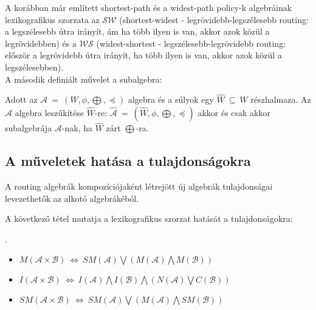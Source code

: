   A korábban már említett shortest-path és a widest-path policy-k algebráinak lexikografikus szorzata az $\mathcal{SW}$ (shortest-widest - legrövidebb-legszélesebb routing: a legszélesebb útra irányít, ám ha több ilyen is van, akkor azok közül a legrövidebben) és a $\mathcal{WS}$ (widest-shortest - legszélesebb-legrövidebb routing: először a legrövidebb útra irányít, ha több ilyen is van, akkor azok közül a legszélesebben).\\

  A második definiált művelet a subalgebra:
  \begin{definition} 
    Adott az $\mathcal{A}~=~(W,\phi,\bigoplus,\preceq)$ algebra és a súlyok egy $\hat{W}~\subseteq~W$ részhalmaza. Az $\mathcal{A}$ algebra leszűkítése $\hat{W}$-re: $\hat{\mathcal{A}}~=~(\hat{W},\phi,\bigoplus,\preceq)$ akkor és csak akkor subalgebrája $\mathcal{A}$-nak, ha $\hat{W}$ zárt $\bigoplus$-ra.
  \end{definition}

    \subsection{A műveletek hatása a tulajdonságokra}\label{sect:section_algebramuveletek_tulajdonsagok}

    A routing algebrák kompozíciójaként létrejött új algebrák tulajdonságai levezethetők az alkotó algebrákéból.

    A következő tétel mutatja a lexikografikus szorzat hatását a tulajdonságokra:
    \begin{theorem}\label{eq:lexi}
      .
      \begin{itemize}
      \item $M(\mathcal{A} \times \mathcal{B})~\Leftrightarrow~ SM(\mathcal{A}) \bigvee (M(\mathcal{A}) \bigwedge M(\mathcal{B}))$
      \item $I(\mathcal{A} \times \mathcal{B})~\Leftrightarrow~ I(\mathcal{A}) \bigwedge I(\mathcal{B}) \bigwedge (N(\mathcal{A}) \bigvee C(\mathcal{B}))$
      \item $SM(\mathcal{A} \times \mathcal{B})~\Leftrightarrow~ SM(\mathcal{A}) \bigvee (M(\mathcal{A}) \bigwedge SM(\mathcal{B}))$\\
      \end{itemize}
    \end{theorem}

